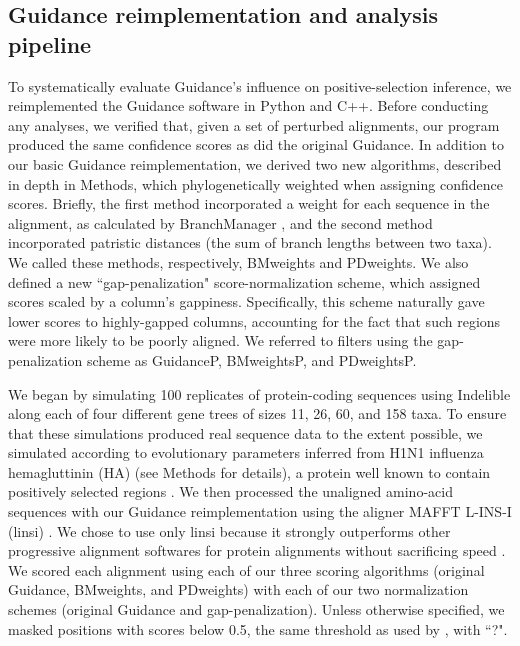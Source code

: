 \documentclass[10pt]{article}
\begin{document}
\subsection*{Guidance reimplementation and analysis pipeline}
To systematically evaluate Guidance's influence on positive-selection inference, we reimplemented the Guidance software in Python and C++. Before conducting any analyses, we verified that, given a set of perturbed alignments, our program produced the same confidence scores as did the original Guidance. In addition to our basic Guidance reimplementation, we derived two new algorithms, described in depth in Methods, which  phylogenetically weighted when assigning confidence scores. Briefly, the first method incorporated a weight for each sequence in the alignment, as calculated by BranchManager \citep{Stone2007}, and the second method incorporated patristic distances (the sum of branch lengths between two taxa). We called these methods, respectively, BMweights and PDweights.  We also defined a new ``gap-penalization" score-normalization scheme, which assigned scores scaled by a column's gappiness. Specifically, this scheme naturally gave lower scores to highly-gapped columns, accounting for the fact that such regions were more likely to be poorly aligned. We referred to filters using the gap-penalization scheme as GuidanceP, BMweightsP, and PDweightsP.

We began by simulating 100 replicates of protein-coding sequences using Indelible \citep{Fletcher2009} along each of four different gene trees of sizes 11, 26, 60, and 158 taxa. To ensure that these simulations produced real sequence data to the extent possible, we simulated according to evolutionary parameters inferred from H1N1 influenza hemagluttinin (HA) (see Methods for details), a protein well known to contain positively selected regions \citep{Bush1999, Kryazhimskiy2008, Meyer2012}. We then processed the unaligned amino-acid sequences with our Guidance reimplementation using the aligner MAFFT L-INS-I (linsi) \citep{Katoh2005}. We chose to use only linsi because it strongly outperforms other progressive alignment softwares for protein alignments without sacrificing speed \citep{Nuin2006,Thompson2011}. We scored each alignment using each of our three scoring algorithms (original Guidance, BMweights, and PDweights) with each of our two normalization schemes (original Guidance and gap-penalization). Unless otherwise specified, we masked positions with scores below 0.5, the same threshold as used by \citet{Jordan2012}, with ``?". 
\end{document}
